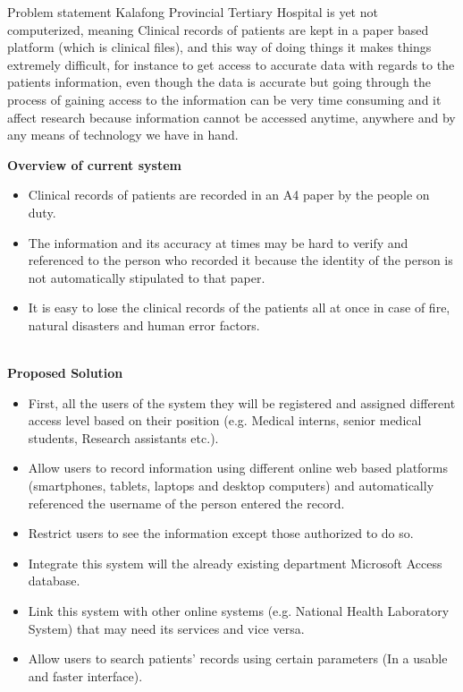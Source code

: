 Problem statement
\newline
Kalafong Provincial Tertiary Hospital is yet not computerized, meaning Clinical records of patients are kept in a paper based platform (which is clinical files), and this way of doing things it makes things extremely difficult, for instance to get access to accurate data with regards to the patients information, even though the data is accurate but going through the process of gaining access to the information can be very time consuming and it affect research because information cannot be accessed anytime, anywhere and by any means of technology we have in hand.

\newline
\textbf{Overview of current system}
\begin{itemize}
	\item Clinical records of patients are recorded in an A4 paper by the people on duty.
	\item The information and its accuracy at times may be hard to verify and referenced to the person who recorded it because the identity of the person is not automatically stipulated to that paper.
	\item It is easy to lose the clinical records of the patients all at once in case of fire, natural disasters and human error factors.
\end{itemize}

\newline \\

\textbf{Proposed Solution}
\newline \\
\begin{itemize}
	\item First, all the users of the system they will be registered and assigned different access level based on their position (e.g. Medical interns, senior medical students, Research assistants etc.).
	\item Allow users to record information using different online web based platforms (smartphones, tablets, laptops and desktop computers) and automatically referenced the username of the person entered the record.
	\item Restrict users to see the information except those authorized to do so.
	\item Integrate this system will the already existing department Microsoft Access database.
	\item Link this system with other online systems (e.g. National Health Laboratory System) that may need its services and vice versa.
	\item Allow users to search patients’ records using certain parameters (In a usable and faster interface).
\end{itemize}

